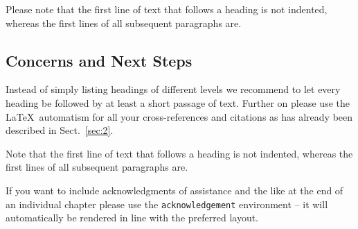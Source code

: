 \documentclass[graybox]{svmult}
\begin{document}
Please note that the first line of text that follows a heading is not indented, whereas the first lines of all subsequent paragraphs are.

\subsection{Concerns and Next Steps} %
Instead of simply listing headings of different levels we recommend to let every heading be followed by at least a short passage of text.  Further on please use the \LaTeX\ automatism for all your cross-references and citations as has already been described in Sect.~\ref{sec:2}.

Note that the first line of text that follows a heading is not indented, whereas the first lines of all subsequent paragraphs are.
%

\begin{acknowledgement}
If you want to include acknowledgments of assistance and the like at the end of an individual chapter please use the \verb|acknowledgement| environment -- it will automatically be rendered in line with the preferred layout.
\end{acknowledgement}





\end{document}
